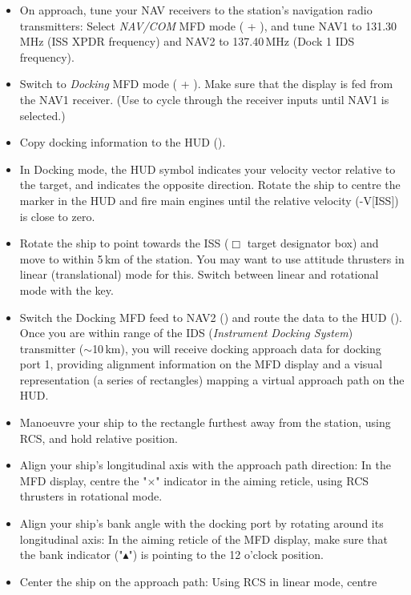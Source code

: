 \documentclass[Orbiter User Manual.tex]{subfiles}
\begin{document}
\begin{itemize}
		want to engage time acceleration until the time-to-reference counters
		are close to zero, indicating that you are approaching the encounter
		point.
	\item On approach, tune your NAV receivers to the station's navigation radio
		transmitters: Select \emph{NAV/COM} MFD mode ( + ),
		and tune NAV1 to 131.30\,MHz (ISS XPDR frequency) and NAV2 to
		137.40\,MHz (Dock 1 IDS frequency).
	\item Switch to \emph{Docking} MFD mode ( + ). Make
		sure that the display is fed from the NAV1 receiver. (Use  to
		cycle through the receiver inputs until NAV1 is selected.)
	\item Copy docking information to the HUD ().
	\item In Docking mode, the \prograde{} HUD symbol indicates your velocity
		vector relative to the target, and \retrograde{} indicates the opposite
		direction. Rotate the ship to centre the \retrograde{} marker in the HUD
		and fire main engines until the relative velocity (-V[ISS]) is close to
		zero.
	\item Rotate the ship to point towards the ISS ($\Box$ target designator
		box) and move to within 5\,km of the station. You may want to use
		attitude thrusters in linear (translational) mode for this. Switch
		between linear and rotational mode with the \keystroke{/}\num{} key.
	\item Switch the Docking MFD feed to NAV2 () and route the data to
		the HUD (). Once you are within range of the IDS
		(\emph{Instrument Docking System}) transmitter ($\sim$10\,km), you will
		receive docking approach data for docking port 1, providing alignment
		information on the MFD display and a visual representation (a series of
		rectangles) mapping a virtual approach path on the HUD.
	\item Manoeuvre your ship to the rectangle furthest away from the station,
		using RCS, and hold relative position.
	\item Align your ship's longitudinal axis with the approach path direction:
		In the MFD display, centre the "$\times$" indicator in the aiming
		reticle, using RCS thrusters in rotational mode.
	\item Align your ship's bank angle with the docking port by rotating around
		its longitudinal axis: In the aiming reticle of the MFD display, make
		sure that the bank indicator ("$\blacktriangle$") is pointing to the 12
		o'clock position.
	\item Center the ship on the approach path: Using RCS in linear mode, centre

\end{itemize}
\end{document}
